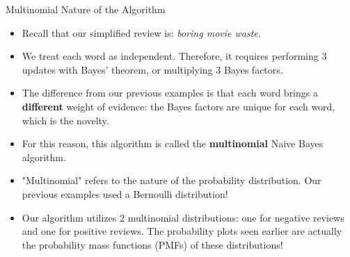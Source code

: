 \begin{frame}{Multinomial Nature of the Algorithm}
	\begin{itemize}
		\item Recall that our simplified review is: \textit{boring movie waste}.
		\pause
		\item We treat each word as independent. Therefore, it requires performing 3 updates with Bayes' theorem, or multiplying 3 Bayes factors.
		\pause
		\item The difference from our previous examples is that each word brings a \textbf{different} weight of evidence: the Bayes factors are unique for each word, which is the novelty.
		\pause
		\item For this reason, this algorithm is called the \textbf{multinomial} Naive Bayes algorithm. 
		\pause
		\item "Multinomial" refers to the nature of the probability distribution. Our previous examples used a Bernoulli distribution!
		\pause
		\item Our algorithm utilizes 2 multinomial distributions: one for negative reviews and one for positive reviews. The probability plots seen earlier are actually the probability mass functions (PMFs) of these distributions!
	\end{itemize}
\end{frame}

